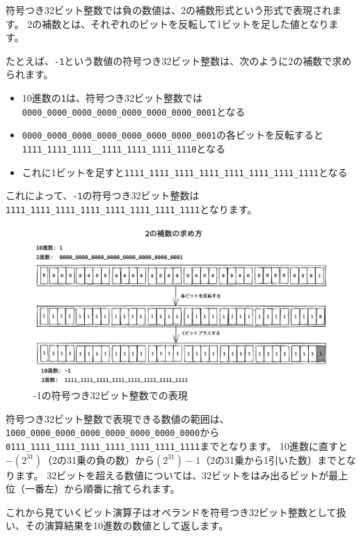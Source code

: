 符号つき32ビット整数では負の数値は、2の補数形式という形式で表現されます。
2の補数とは、それぞれのビットを反転して1ビットを足した値となります。

たとえば、\texttt{-1}という数値の符号つき32ビット整数は、次のように2の補数で求められます。

\begin{itemize}
\item 10進数の\texttt{1}は、符号つき32ビット整数では\texttt{0000\_0000\_0000\_0000\_0000\_0000\_0000\_0001}となる
\item \texttt{0000\_0000\_0000\_0000\_0000\_0000\_0000\_0001}の各ビットを反転すると\texttt{1111\_1111\_1111\_\_1111\_1111\_1111\_1110}となる
\item これに1ビットを足すと\texttt{1111\_1111\_1111\_1111\_1111\_1111\_1111\_1111}となる
\end{itemize}

これによって、\texttt{-1}の符号つき32ビット整数は\texttt{1111\_1111\_1111\_1111\_1111\_1111\_1111\_1111}となります。

\begin{figure}[h]
\centering
\includegraphics[width=140mm]{fig/1111.pdf}
\caption{-1の符号つき32ビット整数での表現}
\end{figure}
\newpage
符号つき32ビット整数で表現できる数値の範囲は、\texttt{1000\_0000\_0000\_0000\_0000\_0000\_0000\_0000}から
\texttt{0111\_1111\_1111\_1111\_1111\_1111\_1111\_1111}までとなります。
10進数に直すと$-(2^{31})$（2の31乗の負の数）から$(2^{31}) - 1$（2の31乗から1引いた数）までとなります。
32ビットを超える数値については、32ビットをはみ出るビットが最上位（一番左）から順番に捨てられます。

これから見ていくビット演算子はオペランドを符号つき32ビット整数として扱い、その演算結果を10進数の数値として返します。

